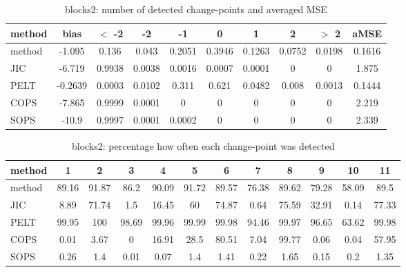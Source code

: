 \begin{table}[ht]
\centering
\begin{tabular}{l|c|ccccccc|c}
  \hline
method & bias & $<$ -2 & -2 & -1 & 0 & 1 & 2 & $>$ 2 & aMSE \\ 
  \hline
method & -1.095 & 0.136 & 0.043 & 0.2051 & 0.3946 & 0.1263 & 0.0752 & 0.0198 & 0.1616 \\ 
  JIC & -6.719 & 0.9938 & 0.0038 & 0.0016 & 0.0007 & 0.0001 &     0 &     0 & 1.875 \\ 
  PELT & -0.2639 & 0.0003 & 0.0102 & 0.311 & 0.621 & 0.0482 & 0.008 & 0.0013 & 0.1444 \\ 
  COPS & -7.865 & 0.9999 & 0.0001 &     0 &     0 &     0 &     0 &     0 & 2.219 \\ 
  SOPS & -10.9 & 0.9997 & 0.0001 & 0.0002 &     0 &     0 &     0 &     0 & 2.339 \\ 
   \hline
\end{tabular}
\caption{blocks2: number of detected change-points and averaged MSE} 
\label{tab:blocks2Njumps}
\end{table}
\begin{table}[ht]
\centering
\begin{tabular}{l|ccccccccccc}
  \hline
method & 1 & 2 & 3 & 4 & 5 & 6 & 7 & 8 & 9 & 10 & 11 \\ 
  \hline
method &  89.16 &  91.87 &   86.2 &  90.09 &  91.72 &  89.57 &  76.38 &  89.62 &  79.28 &  58.09 &   89.5 \\ 
  JIC &   8.89 &  71.74 &    1.5 &  16.45 &     60 &  74.87 &   0.64 &  75.59 &  32.91 &   0.14 &  77.33 \\ 
  PELT &  99.95 &    100 &  98.69 &  99.96 &  99.99 &  99.98 &  94.46 &  99.97 &  96.65 &  63.62 &  99.98 \\ 
  COPS &   0.01 &   3.67 &      0 &  16.91 &   28.5 &  80.51 &   7.04 &  99.77 &   0.06 &   0.04 &  57.95 \\ 
  SOPS &   0.26 &    1.4 &   0.01 &   0.07 &    1.4 &   1.41 &   0.22 &   1.65 &   0.15 &    0.2 &   1.35 \\ 
   \hline
\end{tabular}
\caption{blocks2: percentage how often each change-point was detected} 
\label{tab:blocks2Detections}
\end{table}
